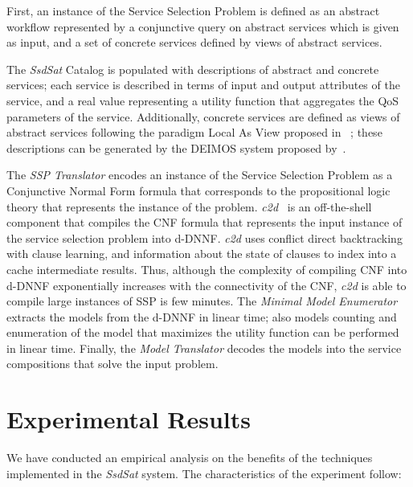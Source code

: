\documentclass{llncs}
\begin{document}
First, an instance of the Service Selection Problem is defined as an abstract workflow represented by a conjunctive query on abstract services which is given as input, and a set of concrete services defined by views of abstract services. 

The {\it SsdSat}  Catalog is populated with descriptions of abstract and concrete services; each service is described in terms of input and output attributes of the service, and a real value representing a utility function that aggregates the QoS parameters of the service. Additionally, concrete services are defined as views of abstract services following the paradigm Local As View proposed in ~\cite{levy:bucket}; these descriptions can be generated by the {\cal DEIMOS} system proposed by~\cite{AmbiteISWC09}. 

The {\it SSP Translator} encodes an instance of the Service Selection Problem as a Conjunctive Normal Form formula that corresponds to the propositional logic theory that represents the instance of the problem.  {\it c2d}~\cite{c2d} is an off-the-shell component that compiles  the CNF formula that represents the input instance of the service selection problem into  d-DNNF. {\it c2d} uses conflict direct backtracking with clause learning, and information about the state of clauses to  index into a cache intermediate results. Thus, although the complexity of  compiling CNF into d-DNNF exponentially increases  with the connectivity  of the  CNF, {\it c2d} is able to compile large instances of SSP is few minutes. The {\it Minimal Model Enumerator} extracts the models from  the d-DNNF in linear time; also models counting and enumeration of the model that maximizes the utility function can be performed in linear time. Finally, 
the {\it Model Translator} decodes the models into the service compositions that solve the input problem.





\section{Experimental Results}
We have conducted an empirical analysis on the benefits of the techniques
implemented in the  {\it SsdSat} system. The characteristics of the experiment
follow:
\end{document}
